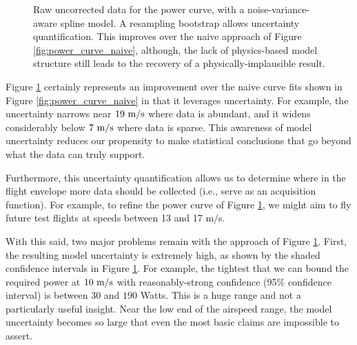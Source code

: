 \begin{figure}[!htb]
    \centering
    \caption{Raw uncorrected data for the power curve, with a noise-variance-aware spline model. A resampling bootstrap allows uncertainty quantification. This improves over the naive approach of Figure \ref{fig:power_curve_naive}, although, the lack of physics-based model structure still leads to the recovery of a physically-implausible result.}
    \label{fig:power_curve_spline_but_no_physics}
\end{figure}

Figure \ref{fig:power_curve_spline_but_no_physics} certainly represents an improvement over the naive curve fits shown in Figure \ref{fig:power_curve_naive} in that it leverages uncertainty. For example, the uncertainty narrows near $19\ \rm m/s$ where data is abundant, and it widens considerably below $7\ \rm m/s$ where data is sparse. This awareness of model uncertainty reduces our propensity to make statistical conclusions that go beyond what the data can truly support.

Furthermore, this uncertainty quantification allows us to determine where in the flight envelope more data should be collected (i.e., serve as an acquisition function). For example, to refine the power curve of Figure \ref{fig:power_curve_spline_but_no_physics}, we might aim to fly future test flights at speeds between 13 and 17 m/s.

With this said, two major problems remain with the approach of Figure \ref{fig:power_curve_spline_but_no_physics}. First, the resulting model uncertainty is extremely high, as shown by the shaded confidence intervals in Figure \ref{fig:power_curve_spline_but_no_physics}. For example, the tightest that we can bound the required power at $10\ \rm m/s$ with reasonably-strong confidence (95\% confidence interval) is between $30$ and $190$ Watts. This is a huge range and not a particularly useful insight. Near the low end of the airspeed range, the model uncertainty becomes so large that even the most basic claims are impossible to assert.

